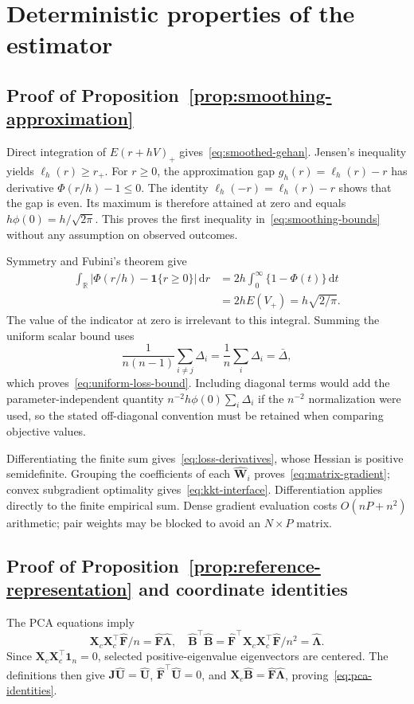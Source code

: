 \section{Deterministic properties of the estimator}
\label{app:method-properties}

\subsection{Proof of Proposition~\ref{prop:smoothing-approximation}}
\label{subapp:smoothing}
Direct integration of $E(r+hV)_+$ gives~\eqref{eq:smoothed-gehan}. Jensen's inequality yields $\ell_h(r)\ge r_+$. For $r\ge0$, the approximation gap $g_h(r)=\ell_h(r)-r$ has derivative $\Phi(r/h)-1\le0$. The identity $\ell_h(-r)=\ell_h(r)-r$ shows that the gap is even. Its maximum is therefore attained at zero and equals $h\phi(0)=h/\sqrt{2\pi}$. This proves the first inequality in~\eqref{eq:smoothing-bounds} without any assumption on observed outcomes.

Symmetry and Fubini's theorem give
\[\begin{aligned}
\int_{\mathbb R}|\Phi(r/h)-\mathbf1\{r\ge0\}|\,\mathrm{d}r
 &=2h\int_0^\infty\{1-\Phi(t)\}\,\mathrm{d}t\\
 &=2hE(V_+)=h\sqrt{2/\pi}.
\end{aligned}\]
The value of the indicator at zero is irrelevant to this integral. Summing the uniform scalar bound uses
\[
 \frac1{n(n-1)}\sum_{i\ne j}\Delta_i
 =\frac1n\sum_i\Delta_i=\bar\Delta,
\]
which proves~\eqref{eq:uniform-loss-bound}. Including diagonal terms would add the parameter-independent quantity $n^{-2}h\phi(0)\sum_i\Delta_i$ if the $n^{-2}$ normalization were used, so the stated off-diagonal convention must be retained when comparing objective values.

Differentiating the finite sum gives~\eqref{eq:loss-derivatives}, whose Hessian is positive semidefinite. Grouping the coefficients of each $\widehat{\bm{W}}_i$ proves~\eqref{eq:matrix-gradient}; convex subgradient optimality gives~\eqref{eq:kkt-interface}. Differentiation applies directly to the finite empirical sum. Dense gradient evaluation costs $O(nP+n^2)$ arithmetic; pair weights may be blocked to avoid an $N\times P$ matrix.

\subsection{Proof of Proposition~\ref{prop:reference-representation} and coordinate identities}
\label{subapp:reference}
The PCA equations imply
\[
 \bm{X}_c\bm{X}_c^\top\widehat{\bm{F}}/n=\widehat{\bm{F}}\widehat{\bm{\Lambda}},
 \quad
 \widehat{\bm{B}}^\top\widehat{\bm{B}}
 =\widehat{\bm{F}}^\top \bm{X}_c\bm{X}_c^\top\widehat{\bm{F}}/n^2
 =\widehat{\bm{\Lambda}}.
\]
Since $\bm{X}_c\bm{X}_c^\top\mathbf 1_n=0$, selected positive-eigenvalue eigenvectors are centered. The definitions then give $\bm{J}\widehat{\bm{U}}=\widehat{\bm{U}}$, $\widehat{\bm{F}}^\top\widehat{\bm{U}}=0$, and $\bm{X}_c\widehat{\bm{B}}=\widehat{\bm{F}}\widehat{\bm{\Lambda}}$, proving~\eqref{eq:pca-identities}.

